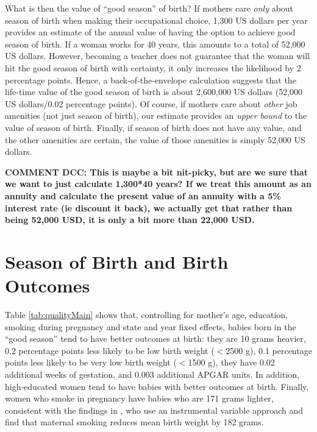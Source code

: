 \documentclass[a4paper, 11.5 pt]{article}
\theoremstyle{plain}
\begin{document}
\begin{doublespace}
What is then the value of ``good season'' of birth? If mothers care \emph{only} about season of birth when making their occupational choice, 1,300 US dollars per year provides an estimate of the annual value of having the option to achieve good season of birth. If a woman works for 40 years, this amounts to a total of 52,000 US dollars. However, becoming a teacher does not guarantee that the woman will hit the good season of birth with certainty, it only increases the likelihood by 2 percentage points. Hence, a back-of-the-envelope calculation suggests that the life-time value of the good season of birth is about 2,600,000 US dollars (52,000 US dollars/0.02 percentage points). Of course, if mothers care about \emph{other} job amenities (not just season of birth), our estimate provides an \emph{upper bound} to the value of season of birth. Finally, if season of birth does not have any value, and the other amenities are certain, the value of those amenities is simply 52,000 US dollars.

\textbf{COMMENT DCC: This is maybe a bit nit-picky, but are we sure that we want to just calculate 1,300*40 years?  If we treat this amount as an annuity and calculate the present value of an annuity with a 5\% interest rate (ie discount it back), we actually get that rather than being 52,000 USD, it is only a bit more than 22,000 USD.}

\newpage
\section{Season of Birth and Birth Outcomes}
\label{scn:birthoutcomes}
Table \ref{tab:qualityMain} shows that, controlling for mother's age, education, smoking during pregnancy and state and year fixed effects, babies born in the ``good season'' tend to have better  outcomes at birth: they are 10 grams heavier, 0.2 percentage points less likely to be low birth weight ($<$2500 g), 0.1 percentage points less likely to be very low birth weight ($<$1500 g), they have 0.02 additional weeks of gestation, and 0.003 additional APGAR units. In addition, high-educated women tend to have babies with better outcomes at birth. Finally, women who smoke in pregnancy have babies who are 171 grams lighter, consistent with the findings in \citet{LienEvans2005}, who use an instrumental variable approach and find that maternal smoking reduces mean birth weight by 182 grams.


\end{doublespace}
\end{document}
